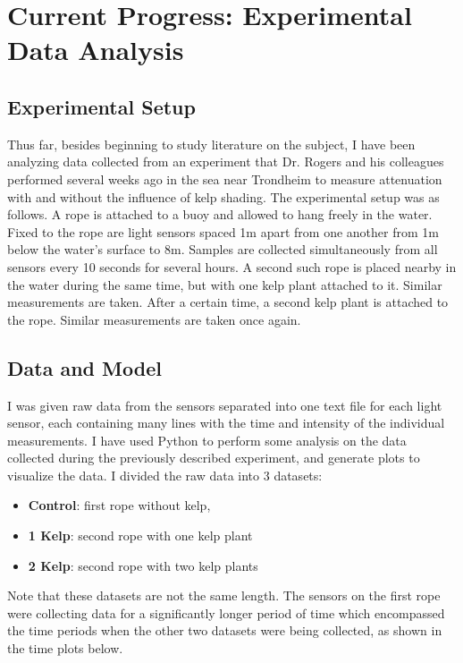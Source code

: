 \section{Current Progress: Experimental Data Analysis}

\subsection{Experimental Setup}
Thus far, besides beginning to study literature on the subject, I have been analyzing data collected from an experiment that Dr. Rogers and his colleagues performed several weeks ago in the sea near Trondheim to measure attenuation with and without the influence of kelp shading. The experimental setup was as follows. A rope is attached to a buoy and allowed to hang freely in the water. Fixed to the rope are light sensors spaced 1m apart from one another from 1m below the water's surface to 8m. Samples are collected simultaneously from all sensors every 10 seconds for several hours. A second such rope is placed nearby in the water during the same time, but with one kelp plant attached to it. Similar measurements are taken. After a certain time, a second kelp plant is attached to the rope. Similar measurements are taken once again.

\subsection{Data and Model}
I was given raw data from the sensors separated into one text file for each light sensor, each containing many lines with the time and intensity of the individual measurements. I have used Python to perform some analysis on the data collected during the previously described experiment, and generate plots to visualize the data. I divided the raw data into 3 datasets:
\begin{itemize}
	\item \textbf{Control}: first rope without kelp,
	\item \textbf{1 Kelp}: second rope with one kelp plant
	\item \textbf{2 Kelp}: second rope with two kelp plants
\end{itemize}

Note that these datasets are not the same length. The sensors on the first rope were collecting data for a significantly longer period of time which encompassed the time periods when the other two datasets were being collected, as shown in the time plots below.

